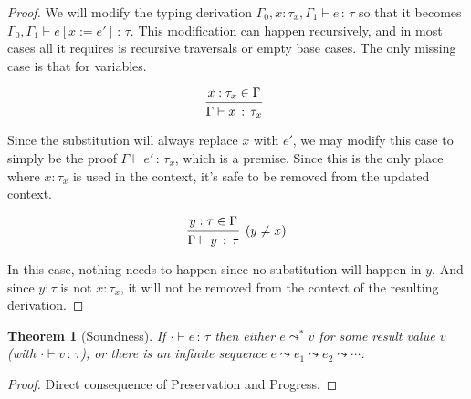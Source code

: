 \documentclass{article}
\newcommand{\todo}[1]{\colorbox{red}{#1}}
\newtheorem{theorem}{Theorem}
\newcommand{\hastp}[3]{#1 \vdash #2 \,:\, #3}
\newcommand{\steps}[2]{#1 \leadsto^* #2}
\newcommand{\deduct}[3][]
{
  \begin{prooftree}
    \hypo{#2}
    \infer1[\text{#1}]{#3}
  \end{prooftree}
}
\begin{document}
\begin{proof}


  We will modify the typing derivation \(\hastp {\Gamma_0, x : \tau_x, \Gamma_1}
  e \tau\) so that it becomes \(\hastp {\Gamma_0, \Gamma_1} {e[x:=e']} \tau\).
  This modification can happen recursively, and in most cases all it requires is
  recursive traversals or empty base cases. The only missing case is that for
  variables.

  \[
    \deduct
      {x : {\tau_x} \in \Gamma}
      {\hastp \Gamma x {\tau_x}}
  \]

  Since the substitution will always replace \(x\) with \(e'\), we may modify
  this case to simply be the proof \(\hastp \Gamma {e'} {\tau_x}\), which is a
  premise. Since this is the only place where \(x : \tau_x\) is used in the
  context, it's safe to be removed from the updated context.

  \[
    \deduct
      {y : \tau \in \Gamma}
      {\hastp \Gamma y \tau}
      {(y \ne x)}
  \]

  In this case, nothing needs to happen since no substitution will happen in
  \(y\). And since \(y : \tau\) is not \(x : \tau_x\), it will not be removed
  from the context of the resulting derivation.
\end{proof}

\begin{theorem}[Soundness]
If $\hastp{\cdot}{e}{\tau}$ then either $\steps{e}{v}$ for some result value $v$
(with $\hastp{\cdot}{v}{\tau}$), or
there is an infinite sequence $e \leadsto e_1 \leadsto e_2 \leadsto \cdots$.
\end{theorem}

\begin{proof}
Direct consequence of Preservation and Progress.
\end{proof}
\end{document}
